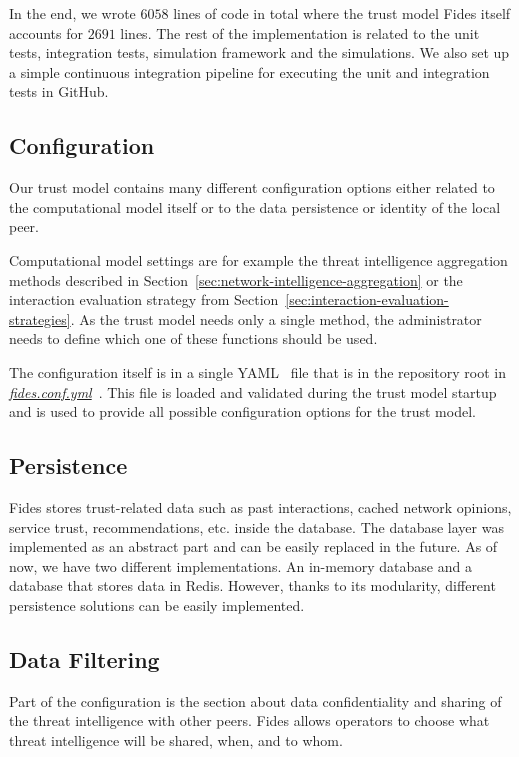 In the end, we wrote $6058$ lines of code in total where the trust model Fides itself accounts for $2691$ lines. The rest of the implementation is related to the unit tests, integration tests, simulation framework and the simulations.
We also set up a simple continuous integration pipeline for executing the unit and integration tests in GitHub.

\subsection{Configuration}
\label{subsec:configuration}
Our trust model contains many different configuration options either related to the computational model itself or to the data persistence or identity of the local peer.

Computational model settings are for example the threat intelligence aggregation methods described in Section~\ref{sec:network-intelligence-aggregation} or the interaction evaluation strategy from Section~\ref{sec:interaction-evaluation-strategies}.
As the trust model needs only a single method, the administrator needs to define which one of these functions should be used.

The configuration itself is in a single YAML~\cite{yaml} file that is in the repository root in \href{https://github.com/LukasForst/fides/blob/master/fides.conf.yml}{\textit{fides.conf.yml}}~\cite{fidesGithub}.
This file is loaded and validated during the trust model startup and is used to provide all possible configuration options for the trust model.

\subsection{Persistence}
\label{subsec:persistence}
Fides stores trust-related data such as past interactions, cached network opinions, service trust, recommendations, etc. inside the database.
The database layer was implemented as an abstract part and can be easily replaced in the future.
As of now, we have two different implementations. An in-memory database and a database that stores data in Redis.
However, thanks to its modularity, different persistence solutions can be easily implemented.

\subsection{Data Filtering}
\label{subsec:data-filtering}
Part of the configuration is the section about data confidentiality and sharing of the threat intelligence with other peers.
Fides allows operators to choose what threat intelligence will be shared, when, and to whom.

